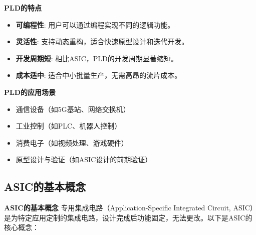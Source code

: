 \documentclass{beamer}
\providecommand{\tightlist}{%
  \setlength{\itemsep}{0pt}\setlength{\parskip}{0pt}}
\begin{document}
\begin{frame}{\textbf{PLD的特点}}
\begin{itemize}
\tightlist
\item
    \textbf{可编程性}: 用户可以通过编程实现不同的逻辑功能。\\
\item
    \textbf{灵活性}: 支持动态重构，适合快速原型设计和迭代开发。\\
\item
    \textbf{开发周期短}: 相比ASIC，PLD的开发周期显著缩短。\\
\item
    \textbf{成本适中}: 适合中小批量生产，无需高昂的流片成本。
\end{itemize}
\end{frame}

\begin{frame}{\textbf{PLD的应用场景}}
\begin{itemize}
\tightlist
\item
    通信设备（如5G基站、网络交换机）\\
\item
    工业控制（如PLC、机器人控制）\\
\item
    消费电子（如视频处理、游戏硬件）\\
\item
    原型设计与验证（如ASIC设计的前期验证）
\end{itemize}
\end{frame}

\subsection{ASIC的基本概念}

\begin{frame}{\textbf{ASIC的基本概念}}
专用集成电路（Application-Specific Integrated Circuit,
ASIC）是为特定应用定制的集成电路，设计完成后功能固定，无法更改。以下是ASIC的核心概念：
\end{frame}
\end{document}
